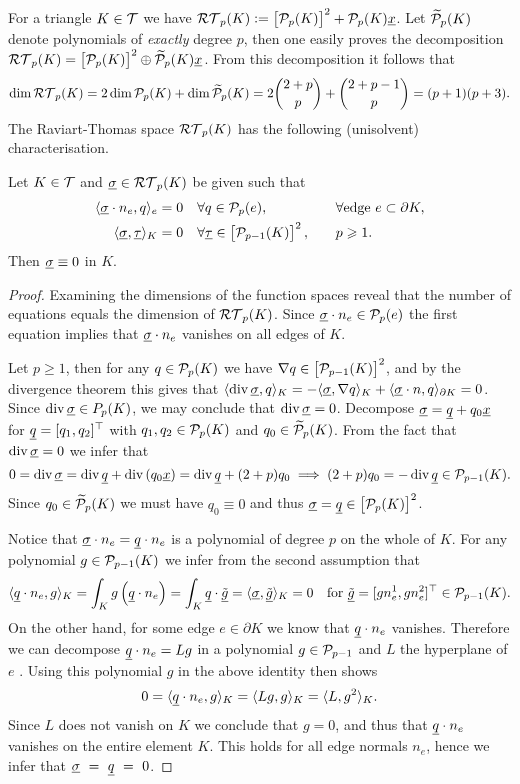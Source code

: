\documentclass[thesis.tex]{subfiles}
\begin{document}
For a triangle $K \in  \T$ we have $\RT_p(K) := \left[ \P_p(K)\right]^2 + \P_p(K)\v{x}$.
Let $\wt \P_p(K)$ denote polynomials of \emph{exactly} degree $p$, then one easily proves the decomposition
$\RT_p(K) = \left [\P_p(K)\right]^2 \oplus \wt \P_p(K) \v{x}$.
From this decomposition it follows that
\[
  \dim{\RT_p(K)} = 2 \dim{\P_p(K)}+ \dim{\wt \P_p(K)} = 2 {2 + p \choose p} + {2 + p - 1 \choose p} = (p+1)(p+3).
\]
The Raviart-Thomas space $\RT_p(K)$ has  the following (unisolvent) characterisation.
\begin{thm}
  Let $K \in  \T$ and $\vsig \in \RT_p(K)$ be given such that
  \begin{alignat*}{2}
    \ip{\vsig \cdot n_e, q}_e &= 0 \quad \forall q \in \P_p(e), &&\quad \forall \text{edge } e \subset \partial K,\\
    \ip{\vsig, \vtau}_K &= 0 \quad \forall \vtau \in \left[\P_{p-1}(K)\right]^2, &&\quad p \geq 1.
  \end{alignat*}
  Then $\vsig \equiv 0$ in $K$.
\end{thm}
\begin{proof}
  Examining the dimensions of the function spaces reveal that the number of equations equals the dimension of $\RT_p(K)$.
  Since $\vsig \cdot n_e \in \P_p(e)$ the first equation implies that $\vsig \cdot n_e$ vanishes on all edges of $K$.

  Let $p \geq 1$, then for any $q \in \P_p(K)$ we have $\nabla q \in \left[\P_{p-1}(K)\right]^2$, and by the divergence theorem this gives that
  $\ip{\div \vsig, q}_K = - \ip{\vsig, \nabla q}_K + \ip{\vsig \cdot n, q}_{\partial K} = 0$. Since $\div \vsig \in P_p(K)$, we
  may conclude that $\div \vsig = 0$.  Decompose $\vsig = \v{q} + q_0\v{x}$ for $\v{q} = [q_1, q_2]^\top$ with $q_1, q_2  \in\P_p(K)$ and $q_0 \in  \wt \P_p(K)$. From the fact that $\div \vsig =0$ we infer that
  \[
    0 = \div \vsig = \div \v{q} + \div \left(q_0 \v{x}\right) = \div \v{q} + (2 + p) q_0 \implies (2 + p) q_0 = - \div \v{q} \in \P_{p-1}(K).
  \]
  Since $q_0 \in \wt \P_p(K)$ we must have $q_0 \equiv 0$ and thus $\vsig = \v{q} \in \left[\P_{p}(K)\right]^2$.

  Notice that $\vsig \cdot n_e = \v{q} \cdot n_e$ is a polynomial of degree $p$  on the whole of $K$.
  For any polynomial $g \in \P_{p-1}(K)$ we infer from the second assumption that
  \[
    \ip{\v{q} \cdot n_e, g}_K = \int_K g \left(\v{q} \cdot n_e\right) = \int_K \v{q} \cdot \v{\tilde g} = \ip{\vsig, \v{\tilde g}}_K = 0 \quad \text{for } \v{\tilde g} = [g n_e^1, gn_e^2]^\top \in \P_{p-1}(K).
  \]
  On the other hand, for some edge $e \in \partial K$ we know that  $\v{q} \cdot n_e$ vanishes.
  Therefore we can decompose $\v{q}\cdot n_e = Lg$ in a polynomial $g \in \P_{p-1}$ and $L$ the hyperplane of $e$ \cite[Lem~3.1.10]{brenner}. Using this polynomial $g$ in the above identity then shows
  \[
    0 = \ip{\v{q}\cdot n_e, g}_K = \ip{Lg, g}_K = \ip{L,g^2}_K.
  \]
  Since $L$ does not vanish on $K$ we conclude that $g = 0$, and thus that $\v{q}\cdot n_e$ vanishes
  on the entire element $K$. This holds for all edge  normals $n_e$,  hence we infer that $\vsig~=~\v{q}~=~0$.
\end{proof}
\end{document}
